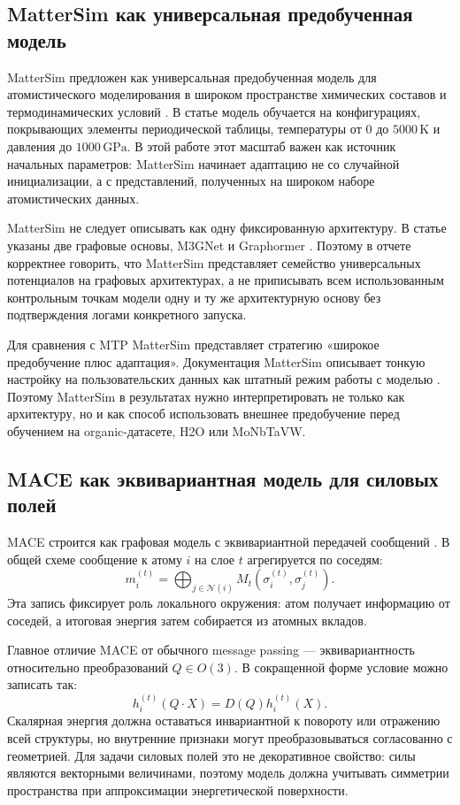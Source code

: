 \subsection{MatterSim как универсальная предобученная модель}

MatterSim предложен как универсальная предобученная модель для атомистического моделирования в широком пространстве химических составов и термодинамических условий \cite{mattersim2024}. В статье модель обучается на конфигурациях, покрывающих элементы периодической таблицы, температуры от \(0\) до \(5000\,\mathrm{K}\) и давления до \(1000\,\mathrm{GPa}\). В этой работе этот масштаб важен как источник начальных параметров: MatterSim начинает адаптацию не со случайной инициализации, а с представлений, полученных на широком наборе атомистических данных.

MatterSim не следует описывать как одну фиксированную архитектуру. В статье указаны две графовые основы, M3GNet и Graphormer \cite{mattersim2024}. Поэтому в отчете корректнее говорить, что MatterSim представляет семейство универсальных потенциалов на графовых архитектурах, а не приписывать всем использованным контрольным точкам модели одну и ту же архитектурную основу без подтверждения логами конкретного запуска.

Для сравнения с MTP MatterSim представляет стратегию «широкое предобучение плюс адаптация». Документация MatterSim описывает тонкую настройку на пользовательских данных как штатный режим работы с моделью \cite{mattersimfinetuningdocs}. Поэтому MatterSim в результатах нужно интерпретировать не только как архитектуру, но и как способ использовать внешнее предобучение перед обучением на organic-датасете, H2O или MoNbTaVW.

\subsection{MACE как эквивариантная модель для силовых полей}

MACE строится как графовая модель с эквивариантной передачей сообщений \cite{mace2022}. В общей схеме сообщение к атому \(i\) на слое \(t\) агрегируется по соседям:
\[
    m_i^{(t)}
    =
    \bigoplus_{j\in \mathcal{N}(i)}
    M_t(\sigma_i^{(t)},\sigma_j^{(t)}).
    \label{eq:mace_general_message}
\]
Эта запись фиксирует роль локального окружения: атом получает информацию от соседей, а итоговая энергия затем собирается из атомных вкладов.

Главное отличие MACE от обычного message passing — эквивариантность относительно преобразований \(Q \in O(3)\). В сокращенной форме условие можно записать так:
\[
    h_i^{(t)}(Q\cdot X)
    =
    D(Q)h_i^{(t)}(X).
    \label{eq:mace_equivariance}
\]
Скалярная энергия должна оставаться инвариантной к повороту или отражению всей структуры, но внутренние признаки могут преобразовываться согласованно с геометрией. Для задачи силовых полей это не декоративное свойство: силы являются векторными величинами, поэтому модель должна учитывать симметрии пространства при аппроксимации энергетической поверхности.


